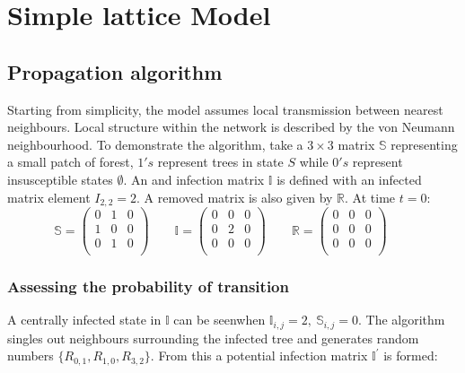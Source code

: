 \appendix
\chapter{Simple lattice Model}

\section{Propagation algorithm}
\label{a:propagation}
Starting from simplicity, the model assumes local transmission between nearest neighbours. Local structure within the network is described by the von Neumann neighbourhood. To demonstrate the algorithm, take a $3 \times 3$  matrix $\mathbb{S}$ representing a small patch of forest, $1's$ represent trees in state $S$ while $0's$ represent insusceptible states $\emptyset$. An and infection matrix $\mathbb{I}$ is defined with an infected matrix element $I_{2,2}=2$. A removed matrix is also given by $\mathbb{R}$. At time $t=0$:
\begin{equation}
\mathbb{S}= \left( \begin{array}{ccc}
0 & 1 & 0\\
1 & 0 & 0\\
0& 1 & 0 \\
\end{array} \right)\qquad
\mathbb{I}= \left( \begin{array}{ccc}
0 & 0 & 0\\
0 &2 & 0\\
0& 0 & 0 \\
\end{array} \right)\qquad
\mathbb{R} = \left( \begin{array}{ccc}
0 & 0 & 0\\
0 & 0 & 0\\
0 & 0 & 0 \\
\end{array} \right)\qquad
\end{equation}

\subsection{Assessing the probability of transition}
\label{a:probablity-transition}

A centrally infected state in $\mathbb{I}$ can be seen\textemdash when $\mathbb{I}_{i,j} = 2,\ \mathbb{S}_{i,j} = 0$. The algorithm singles out neighbours surrounding the infected tree and generates random numbers $\{ R_{0,1},R_{1,0},R_{3,2}\}$. From this a potential infection matrix $\mathbb{I}^{'}$ is formed:

